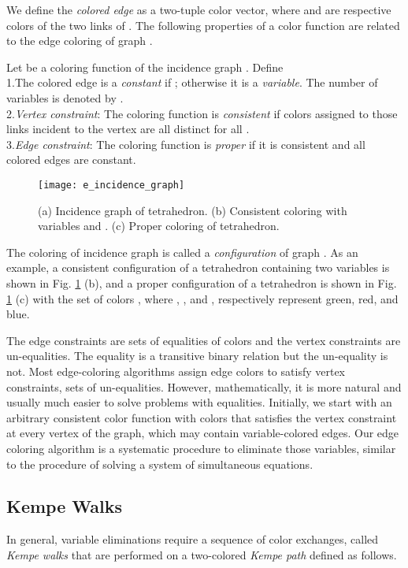 \documentclass[11pt]{article}
\newenvironment{definition}[1][Definition]{\begin{trivlist}
\item[\hskip \labelsep {\bfseries #1}]}{\end{trivlist}}
\begin{document}
We define the {\it colored edge}  as a two-tuple color vector, where  and  are respective colors of the two links of . The following properties of a color function  are related to the edge coloring of graph . 

\begin{definition}
\label{definition:coloring}
Let  be a coloring function of the incidence graph . Define\\
1.The colored edge  is a {\it constant} if ; otherwise it is a {\it variable}. The number of variables is denoted by .\\
2.{\it Vertex constraint}: The coloring function  is {\it consistent} if colors assigned to those links incident to the vertex  are all distinct for all .	\\
3.{\it Edge constraint}: The coloring function  is {\it proper} if it is consistent and all colored edges are constant.
\end{definition}

\begin{figure}[htpb]
	\centering
	\texttt{[image: e\_incidence\_graph]}
	\caption{(a) Incidence graph of tetrahedron. (b) Consistent coloring with variables  and . (c) Proper coloring of tetrahedron.}
	\label{fig:incidencetetrahedron}
\end{figure}

The coloring of incidence graph  is called a {\it configuration} of graph . As an example, a consistent configuration of a tetrahedron containing two variables is shown in Fig. \ref{fig:incidencetetrahedron} (b), and a proper configuration of a tetrahedron is shown in Fig. \ref{fig:incidencetetrahedron} (c) with the set of colors , where , , and , respectively represent green, red, and blue.


The edge constraints are sets of equalities of colors and the vertex constraints are un-equalities. The equality is a transitive binary relation but the un-equality is not. Most edge-coloring algorithms assign edge colors to satisfy vertex constraints, sets of un-equalities. However, mathematically, it is more natural and usually much easier to solve problems with equalities. Initially, we start with an arbitrary consistent color function  with  colors that satisfies the vertex constraint at every vertex of the graph, which may contain variable-colored edges. Our edge coloring algorithm is a systematic procedure to eliminate those variables, similar to the procedure of solving a system of simultaneous equations. 


\subsection{Kempe Walks}
In general, variable eliminations require a sequence of color exchanges, called {\it Kempe walks} that are performed on a two-colored {\it Kempe path} defined as follows.
\end{document}

